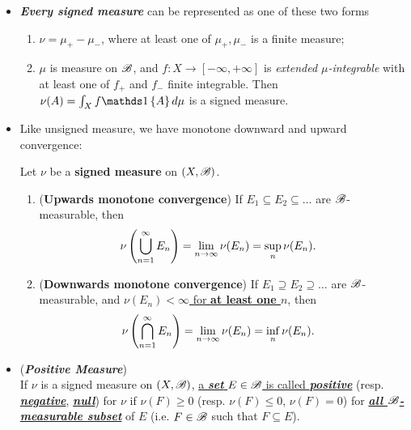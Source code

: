 \documentclass[11pt]{article}
\begin{document}
\begin{itemize}
\item \begin{remark}
\emph{\textbf{Every  signed measure}} can be represented as one of these two forms 
\begin{enumerate}
\item $\nu = \mu_{+}- \mu_{-}$, where at least one of $\mu_{+}, \mu_{-}$ is a finite measure;
\item $\mu$ is measure on ${\mathscr B}$, and $f: X \rightarrow [-\infty, +\infty]$ is \emph{extended $\mu$-integrable} with at least one of $f_{+}$ and $f_{-}$ finite integrable. Then $\nu(A) = \int_{X}f\ind{A} d\mu $ is a signed measure.
\end{enumerate}
\end{remark}

\item Like unsigned measure, we have monotone downward and upward convergence: 
\begin{proposition} 
Let $\nu$ be a \textbf{signed measure} on $(X, {\mathscr B})$.
\begin{enumerate}
\item (\textbf{Upwards monotone convergence}) If $E_1 \subseteq E_2 \subseteq \ldots$ are ${\mathscr B}$-measurable, then
\begin{align}
\nu\left(\bigcup_{n=1}^{\infty} E_n\right) &= \lim\limits_{n\rightarrow \infty}\nu(E_n) = \sup\limits_{n}\nu(E_n). \label{eqn: signed_measure_upward_monotone_convergence}
\end{align}
\item (\textbf{Downwards monotone convergence}) If $E_1 \supseteq E_2 \supseteq \ldots$ are ${\mathscr B}$-measurable, and \underline{$\nu(E_n) < \infty$ for \textbf{at least one $n$}}, then
\begin{align}
\nu\left(\bigcap_{n=1}^{\infty} E_n\right) &= \lim\limits_{n\rightarrow \infty}\nu(E_n) = \inf\limits_{n}\nu(E_n). \label{eqn: signed_measure_downward_monotone_convergence}
\end{align}
\end{enumerate}
\end{proposition}



\item \begin{definition} (\emph{\textbf{Positive Measure}})\\
If $\nu$ is a signed measure on $(X,{\mathscr B})$, \underline{a \textbf{\emph{set}} $E\in {\mathscr B}$ is called \emph{\textbf{positive}}} (resp. \underline{\emph{\textbf{negative}}}, \underline{\emph{\textbf{null}}}) for $\nu$ if $\nu(F)\ge 0$ (resp. $\nu(F)\le 0$, $\nu(F)= 0$) for \underline{\emph{\textbf{all ${\mathscr B}$-measurable subset}}} of $E$ (i.e. $F\in {\mathscr B}$ such that $F\subseteq E$).  


\end{definition}
\end{itemize}
\end{document}

